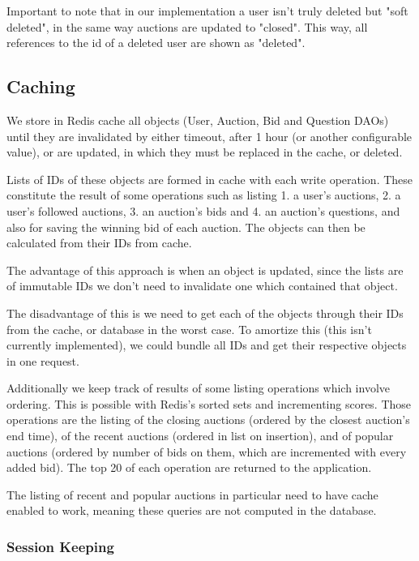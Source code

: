 \documentclass[runningheads]{llncs}
\begin{document}
Important to note that in our implementation a user isn't truly deleted but "soft deleted", in the same way auctions are updated to "closed". This way, all references to the id of a deleted user are shown as "deleted".

\subsection{Caching}

We store in Redis cache all objects (User, Auction, Bid and Question DAOs) until they are invalidated by either timeout, after 1 hour (or another configurable value), or are updated, in which they must be replaced in the cache, or deleted. 

Lists of IDs of these objects are formed in cache with each write operation. These constitute the result of some operations such as listing 1. a user's auctions, 2. a user's followed auctions, 3. an auction's bids and 4. an auction's questions, and also for saving the winning bid of each auction. The objects can then be calculated from their IDs from cache. 

The advantage of this approach is when an object is updated, since the lists are of immutable IDs we don't need to invalidate one which contained that object. 

The disadvantage of this is we need to get each of the objects through their IDs from the cache, or database in the worst case. To amortize this (this isn't currently implemented), we could bundle all IDs and get their respective objects in one request.

Additionally we keep track of results of some listing operations which involve ordering. This is possible with Redis's sorted sets and incrementing scores. Those operations are the listing of the closing auctions (ordered by the closest auction's end time), of the recent auctions (ordered in list on insertion), and of popular auctions (ordered by number of bids on them, which are incremented with every added bid). The top 20 of each operation are returned to the application.

The listing of recent and popular auctions in particular need to have cache enabled to work, meaning these queries are not computed in the database.


\subsubsection{Session Keeping}
\end{document}

